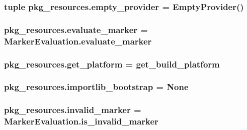 \subsubsection[{empty\+\_\+provider}]{\setlength{\rightskip}{0pt plus 5cm}tuple pkg\+\_\+resources.\+empty\+\_\+provider = {\bf Empty\+Provider}()}\label{namespacepkg__resources_a1f22b99f4d3fd3ba7a293a9e53351377}
\hypertarget{namespacepkg__resources_abd062a5f98d02acdc1ef833394d311eb}{}
\subsubsection[{evaluate\+\_\+marker}]{\setlength{\rightskip}{0pt plus 5cm}pkg\+\_\+resources.\+evaluate\+\_\+marker = Marker\+Evaluation.\+evaluate\+\_\+marker}\label{namespacepkg__resources_abd062a5f98d02acdc1ef833394d311eb}
\hypertarget{namespacepkg__resources_aed6997ba900a5733dcb3ebe4492eaa83}{}
\subsubsection[{get\+\_\+platform}]{\setlength{\rightskip}{0pt plus 5cm}pkg\+\_\+resources.\+get\+\_\+platform = {\bf get\+\_\+build\+\_\+platform}}\label{namespacepkg__resources_aed6997ba900a5733dcb3ebe4492eaa83}
\hypertarget{namespacepkg__resources_aa5ed332c97cdf6c3a282f990051a01a8}{}
\subsubsection[{importlib\+\_\+bootstrap}]{\setlength{\rightskip}{0pt plus 5cm}pkg\+\_\+resources.\+importlib\+\_\+bootstrap = None}\label{namespacepkg__resources_aa5ed332c97cdf6c3a282f990051a01a8}
\hypertarget{namespacepkg__resources_a1331f971b3e1d2e7635edde4a025e72f}{}
\subsubsection[{invalid\+\_\+marker}]{\setlength{\rightskip}{0pt plus 5cm}pkg\+\_\+resources.\+invalid\+\_\+marker = {\bf Marker\+Evaluation.\+is\+\_\+invalid\+\_\+marker}}\label{namespacepkg__resources_a1331f971b3e1d2e7635edde4a025e72f}
\hypertarget{namespacepkg__resources_a0003897e2044a6bedb14a89ad7cc5ce9}{}
